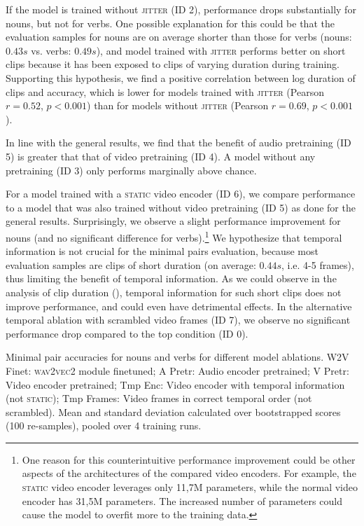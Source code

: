 If the model is trained without \textsc{jitter} (ID 2), performance drops 
substantially
for nouns, but not for verbs. One possible explanation for this could be that 
the evaluation samples for nouns are on average shorter than those for verbs 
(nouns: $0.43s$ vs. verbs: $0.49s$), and model trained with \textsc{jitter} 
performs better on short clips because it has been exposed to clips of varying 
duration during training. Supporting this hypothesis, we find a positive 
correlation between log duration of clips and accuracy, which is lower for 
models trained with \textsc{jitter} (Pearson $r= 0.52$, $p < 0.001$) than for 
models without \textsc{jitter} (Pearson $r= 0.69$, $p < 0.001$).

In line with the general results, we find that the benefit of audio pretraining 
(ID 5) is greater that that of video pretraining (ID 4). A model without any 
pretraining (ID 3) only performs marginally above chance.

For a model trained with a \textsc{static} video encoder (ID 6), we compare 
performance to a model that was also trained without video pretraining (ID 5) 
as done for the general results. Surprisingly, we observe a slight performance 
improvement for nouns (and no significant difference for verbs).\footnote{One 
reason for this counterintuitive performance improvement could be other aspects 
of the architectures of the compared video encoders. For example, the 
\textsc{static} video encoder leverages only 11,7M parameters, while the 
normal video encoder has 31,5M parameters. The increased number of parameters 
could cause the model to overfit more to the training data.} We hypothesize 
that temporal information is not crucial for the minimal pairs evaluation, 
because most evaluation samples are clips of short duration (on average: 
$0.44s$, i.e. 4-5 frames), thus limiting the benefit of temporal information.
As we could observe in the analysis of clip duration 
(), temporal information for such short clips does 
not improve performance, and could even have detrimental effects.
In the alternative temporal ablation with scrambled video frames (ID 7), we 
observe no significant performance drop compared to the top condition (ID 
0).
\begin{table}[htb]
	\centering
	
	\caption{Minimal pair accuracies for nouns and verbs for different model 
		ablations. W2V Finet: \textsc{wav2vec2} module finetuned; A Pretr: 
		Audio encoder pretrained; V Pretr: Video encoder pretrained; Tmp 
		Enc: Video encoder with temporal information (not \textsc{static}); 
		Tmp Frames: Video frames in correct temporal order (not scrambled). 
		Mean and standard 
		deviation calculated over bootstrapped scores (100 re-samples), pooled 
		over 4 training runs.}
	\label{tab:minimal_pair_results}
\end{table}


